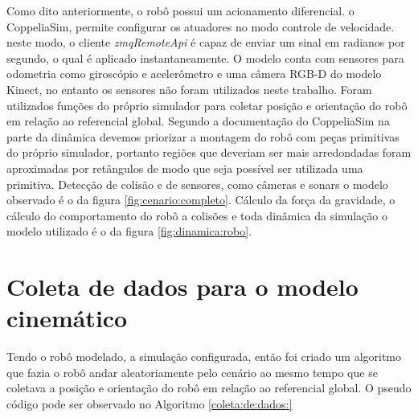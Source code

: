 Como dito anteriormente, o robô possui um acionamento diferencial.
o CoppeliaSim, permite configurar os atuadores no modo controle de
velocidade. neste modo, o cliente \textit{zmqRemoteApi} é capaz de enviar
um sinal em radianos por segundo, o qual é aplicado instantaneamente.
O modelo conta com sensores para odometria como giroscópio e acelerômetro
e uma câmera RGB-D do modelo Kinect, no entanto os sensores não foram
utilizados neste trabalho.
Foram utilizados funções do próprio simulador para coletar posição e 
orientação do robô em relação ao referencial global.
Segundo a documentação do CoppeliaSim na parte da dinâmica
devemos priorizar a montagem do robô com peças primitivas do próprio
simulador, portanto regiões que deveriam ser mais arredondadas foram
aproximadas por retângulos de modo que seja possível ser utilizada uma
primitiva. Detecção de colisão e de sensores, como câmeras e sonars o modelo
observado é o da figura \ref{fig:cenario:completo}. Cálculo da força da
gravidade, o cálculo do comportamento  do robô a colisões e toda dinâmica
da simulação o modelo utilizado
é o da figura \ref{fig:dinamica:robo}.


\section{Coleta de dados para o modelo cinemático}
Tendo o robô modelado, a simulação configurada, então foi criado
um algoritmo que fazia o robô andar aleatoriamente pelo cenário ao mesmo
tempo que se coletava a posição e orientação do robô em relação ao referencial
global. O pseudo código pode ser observado no Algoritmo \ref{coleta:de:dados:}

